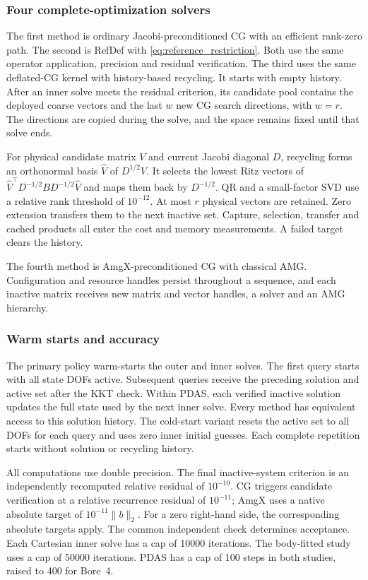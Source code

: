 \subsubsection{Four complete-optimization solvers}
The first method is ordinary Jacobi-preconditioned CG with an
efficient rank-zero path. The second is RefDef with
\eqref{eq:reference_restriction}. Both use the same operator
application, precision and residual verification. The third uses
the same deflated-CG kernel with history-based recycling. It starts
with empty history. After an inner solve meets the residual criterion, its candidate
pool contains the deployed coarse vectors and the last $w$ new
CG search directions, with $w=r$. The directions are copied during
the solve, and the space remains fixed until that solve ends.

For physical candidate matrix $V$ and current Jacobi diagonal $D$,
recycling forms an orthonormal basis $\widehat V$ of $D^{1/2}V$.
It selects the lowest Ritz vectors of
$\widehat V^\top D^{-1/2}BD^{-1/2}\widehat V$ and maps them back
by $D^{-1/2}$. QR and a small-factor SVD use a relative rank threshold
of $10^{-12}$. At most $r$ physical vectors are retained.
Zero extension transfers them to the next inactive set.
Capture, selection, transfer and cached products all enter the
cost and memory measurements. A failed target clears the history.

The fourth method is AmgX-preconditioned CG with classical AMG. Configuration and
resource handles persist throughout a sequence, and each inactive matrix receives
new matrix and vector handles, a solver and an AMG hierarchy.

\subsubsection{Warm starts and accuracy}
The primary policy warm-starts the outer and inner solves.
The first query starts with all state DOFs active.
Subsequent queries receive the preceding solution and active
set after the KKT check. Within PDAS, each verified inactive solution updates
the full state used by the next inner solve. Every method has equivalent
access to this solution history. The cold-start variant resets the
active set to all DOFs for each query and uses zero
inner initial guesses. Each complete repetition starts without
solution or recycling history.

All computations use double precision. The final inactive-system
criterion is an independently recomputed relative residual of
$10^{-10}$. CG triggers candidate verification at a relative
recurrence residual of $10^{-11}$; AmgX uses a native absolute
target of $10^{-11}\|b\|_2$. For a zero right-hand side, the
corresponding absolute targets apply. The common independent
check determines acceptance. Each Cartesian inner solve has a cap of
10000 iterations. The body-fitted study uses a cap of 50000 iterations.
PDAS has a cap of 100 steps in both studies, raised to 400 for Bore~4.

